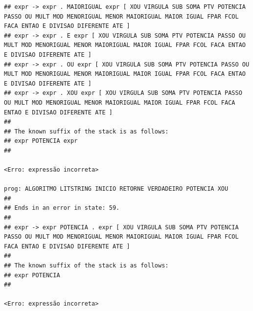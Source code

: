 \documentclass[hidelinks,12pt]{article}
\begin{document}
\begin{lstlisting}
## expr -> expr . MAIORIGUAL expr [ XOU VIRGULA SUB SOMA PTV POTENCIA PASSO OU MULT MOD MENORIGUAL MENOR MAIORIGUAL MAIOR IGUAL FPAR FCOL FACA ENTAO E DIVISAO DIFERENTE ATE ]
## expr -> expr . E expr [ XOU VIRGULA SUB SOMA PTV POTENCIA PASSO OU MULT MOD MENORIGUAL MENOR MAIORIGUAL MAIOR IGUAL FPAR FCOL FACA ENTAO E DIVISAO DIFERENTE ATE ]
## expr -> expr . OU expr [ XOU VIRGULA SUB SOMA PTV POTENCIA PASSO OU MULT MOD MENORIGUAL MENOR MAIORIGUAL MAIOR IGUAL FPAR FCOL FACA ENTAO E DIVISAO DIFERENTE ATE ]
## expr -> expr . XOU expr [ XOU VIRGULA SUB SOMA PTV POTENCIA PASSO OU MULT MOD MENORIGUAL MENOR MAIORIGUAL MAIOR IGUAL FPAR FCOL FACA ENTAO E DIVISAO DIFERENTE ATE ]
##
## The known suffix of the stack is as follows:
## expr POTENCIA expr 
##

<Erro: expressão incorreta>

prog: ALGORITMO LITSTRING INICIO RETORNE VERDADEIRO POTENCIA XOU 
##
## Ends in an error in state: 59.
##
## expr -> expr POTENCIA . expr [ XOU VIRGULA SUB SOMA PTV POTENCIA PASSO OU MULT MOD MENORIGUAL MENOR MAIORIGUAL MAIOR IGUAL FPAR FCOL FACA ENTAO E DIVISAO DIFERENTE ATE ]
##
## The known suffix of the stack is as follows:
## expr POTENCIA 
##

<Erro: expressão incorreta>


\end{lstlisting}
\end{document}
